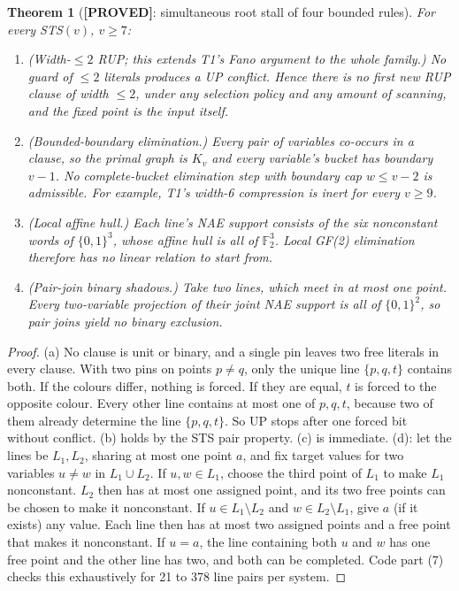 \documentclass[11pt]{article}
\newtheorem{theorem}{Theorem}
\theoremstyle{definition}
\theoremstyle{remark}
\newcommand{\lab}[1]{\textbf{[#1]}}
\begin{document}
\begin{theorem}[\lab{PROVED}: simultaneous root stall of four bounded rules]\label{thm:stall}
For every STS$(v)$, $v\ge7$:
\begin{enumerate}
\item[(a)] (Width-$\le2$ RUP; this extends T1's Fano argument to the whole family.) No
guard of $\le2$ literals produces a UP conflict. Hence there is no first new RUP clause
of width $\le2$, under any selection policy and any amount of scanning, and the fixed
point is the input itself.
\item[(b)] (Bounded-boundary elimination.) Every pair of variables co-occurs in a clause,
so the primal graph is $K_v$ and every variable's bucket has boundary $v-1$. No
complete-bucket elimination step with boundary cap $w\le v-2$ is admissible. For example,
T1's width-6 compression is inert for every $v\ge9$.
\item[(c)] (Local affine hull.) Each line's NAE support consists of the six nonconstant
words of $\{0,1\}^3$, whose affine hull is all of $\mathbb F_2^3$. Local GF(2) elimination
therefore has no linear relation to start from.
\item[(d)] (Pair-join binary shadows.) Take two lines, which meet in at most one point.
Every two-variable projection of their joint NAE support is all of $\{0,1\}^2$, so pair
joins yield no binary exclusion.
\end{enumerate}
\end{theorem}
\begin{proof}
(a) No clause is unit or binary, and a single pin leaves two free literals in every
clause. With two pins on points $p\ne q$, only the unique line $\{p,q,t\}$ contains both.
If the colours differ, nothing is forced. If they are equal, $t$ is forced to the opposite
colour. Every other line contains at most one of $p,q,t$, because two of them already
determine the line $\{p,q,t\}$. So UP stops after one forced bit without conflict.
(b) holds by the STS pair property. (c) is immediate.
(d): let the lines be $L_1,L_2$, sharing at most one point $a$, and fix target values for
two variables $u\ne w$ in $L_1\cup L_2$. If $u,w\in L_1$, choose the third point of $L_1$
to make $L_1$ nonconstant. $L_2$ then has at most one assigned point, and its two free points
can be chosen to make it nonconstant. If $u\in L_1\setminus L_2$ and $w\in L_2\setminus L_1$,
give $a$ (if it exists) any value. Each line then has at most two assigned points and a
free point that makes it nonconstant. If $u=a$, the line containing both $u$ and $w$ has one
free point and the other line has two, and both can be completed. Code part (7) checks this
exhaustively for 21 to 378 line pairs per system.
\end{proof}
\end{document}
